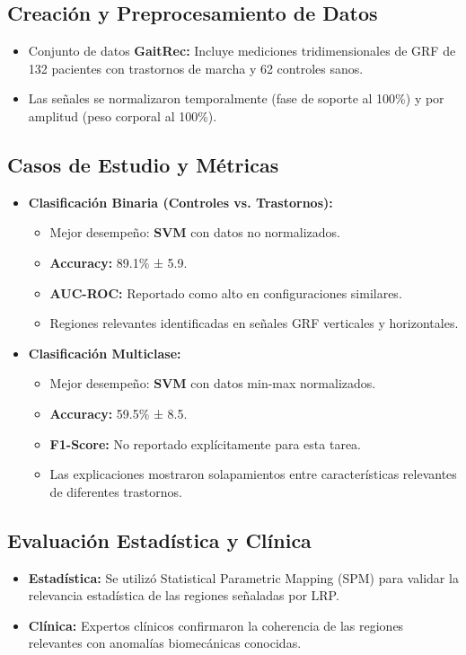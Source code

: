 \documentclass{report}
\begin{document}
\subsection{Creación y Preprocesamiento de Datos}
\begin{itemize}
    \item Conjunto de datos \textbf{GaitRec:} Incluye mediciones tridimensionales de GRF de 132 pacientes con trastornos de marcha y 62 controles sanos.
    \item Las señales se normalizaron temporalmente (fase de soporte al 100\%) y por amplitud (peso corporal al 100\%).
\end{itemize}

\subsection{Casos de Estudio y Métricas}
\begin{itemize}
    \item \textbf{Clasificación Binaria (Controles vs. Trastornos):}
    \begin{itemize}
        \item Mejor desempeño: \textbf{SVM} con datos no normalizados.
        \item \textbf{Accuracy:} 89.1\% ± 5.9.
        \item \textbf{AUC-ROC:} Reportado como alto en configuraciones similares.
        \item Regiones relevantes identificadas en señales GRF verticales y horizontales.
    \end{itemize}
    \item \textbf{Clasificación Multiclase:}
    \begin{itemize}
        \item Mejor desempeño: \textbf{SVM} con datos min-max normalizados.
        \item \textbf{Accuracy:} 59.5\% ± 8.5.
        \item \textbf{F1-Score:} No reportado explícitamente para esta tarea.
        \item Las explicaciones mostraron solapamientos entre características relevantes de diferentes trastornos.
    \end{itemize}
\end{itemize}

\subsection{Evaluación Estadística y Clínica}
\begin{itemize}
    \item \textbf{Estadística:} Se utilizó Statistical Parametric Mapping (SPM) para validar la relevancia estadística de las regiones señaladas por LRP.
    \item \textbf{Clínica:} Expertos clínicos confirmaron la coherencia de las regiones relevantes con anomalías biomecánicas conocidas.
\end{itemize}
\end{document}
